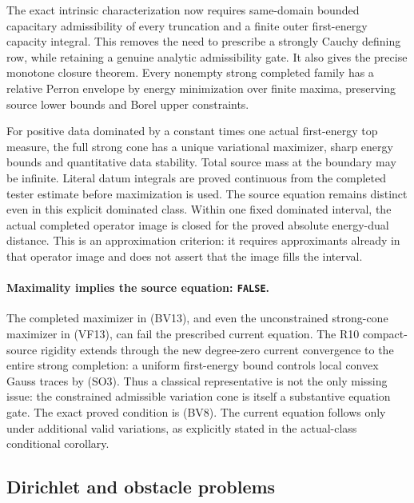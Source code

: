 \documentclass[11pt,a4paper]{article}
\numberwithin{equation}{section}
\theoremstyle{definition}
\theoremstyle{remark}
\begin{document}
The exact intrinsic characterization now requires same-domain
bounded capacitary admissibility of every truncation and a
finite outer first-energy capacity integral. This removes
the need to prescribe a strongly Cauchy defining row, while
retaining a genuine analytic admissibility gate. It also
gives the precise monotone closure theorem. Every nonempty
strong completed family has a relative Perron envelope by
energy minimization over finite maxima, preserving source
lower bounds and Borel upper constraints.

For positive data dominated by a constant times one actual
first-energy top measure, the full strong cone has a unique
variational maximizer, sharp energy bounds and quantitative
data stability. Total source mass at the boundary may be
infinite. Literal datum integrals are proved continuous from
the completed tester estimate before maximization is used.
The source equation remains distinct even in this explicit
dominated class.
Within one fixed dominated interval, the actual completed
operator image is closed for the proved absolute
energy-dual distance. This is an approximation criterion:
it requires approximants already in that operator image
and does not assert that the image fills the interval.

\paragraph{Maximality implies the source equation: \texttt{FALSE}.}
The completed maximizer in (BV13), and even the
unconstrained strong-cone maximizer in (VF13), can
fail the prescribed current equation.
The R10 compact-source rigidity extends through
the new degree-zero current convergence to the
entire strong completion: a uniform first-energy
bound controls local convex Gauss traces by (SO3).
Thus a classical representative is not
the only missing issue: the constrained
admissible variation cone is itself a
substantive equation gate.
The exact proved condition is (BV8).
The current equation follows only under
additional valid variations, as explicitly
stated in the actual-class conditional
corollary.

\subsection{Dirichlet and obstacle problems}
\end{document}
